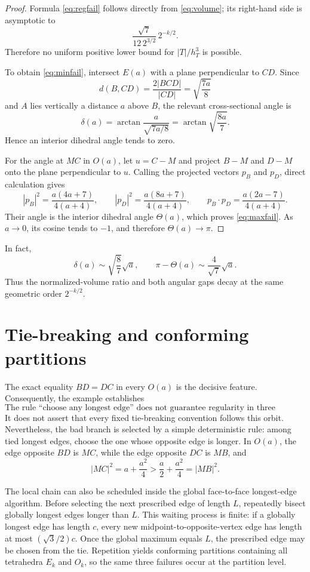 \documentclass[10pt]{article}
\theoremstyle{definition}
\begin{document}
\begin{proof}
Formula \eqref{eq:regfail} follows directly from \eqref{eq:volume}; its right-hand side is asymptotic to
\[
\frac{\sqrt7}{12\,2^{3/2}}\,2^{-k/2}.
\]
Therefore no uniform positive lower bound for $|T|/h_T^3$ is possible.

To obtain \eqref{eq:minfail}, intersect $E(a)$ with a plane perpendicular to $CD$.  Since
\[
d(B,CD)=\frac{2|BCD|}{|CD|}=\sqrt{\frac{7a}{8}}
\]
and $A$ lies vertically a distance $a$ above $B$, the relevant cross-sectional angle is
\[
\delta(a)=\arctan\frac{a}{\sqrt{7a/8}}
=\arctan\sqrt{\frac{8a}{7}}.
\]
Hence an interior dihedral angle tends to zero.

For the angle at $MC$ in $O(a)$, let $u=C-M$ and project $B-M$ and $D-M$ onto the plane perpendicular to $u$.  Calling the projected vectors $p_B$ and $p_D$, direct calculation gives
\[
|p_B|^2=\frac{a(4a+7)}{4(a+4)},\qquad
|p_D|^2=\frac{a(8a+7)}{4(a+4)},\qquad
p_B\!\cdot p_D=\frac{a(2a-7)}{4(a+4)}.
\]
Their angle is the interior dihedral angle $\Theta(a)$, which proves \eqref{eq:maxfail}.  As $a\to0$, its cosine tends to $-1$, and therefore $\Theta(a)\to\pi$.
\end{proof}

In fact,
\begin{equation}\label{eq:rates}
\delta(a)\sim\sqrt{\frac87}\sqrt a,
\qquad
\pi-\Theta(a)\sim\frac4{\sqrt7}\sqrt a.
\end{equation}
Thus the normalized-volume ratio and both angular gaps decay at the same geometric order $2^{-k/2}$.



\section{Tie-breaking and conforming partitions}

The exact equality $BD=DC$ in every $O(a)$ is the decisive feature.  Consequently, the example establishes
\[
\boxed{\text{The rule ``choose any longest edge'' does not guarantee regularity in three dimensions.}}
\]
It does not assert that every fixed tie-breaking convention follows this orbit.  Nevertheless, the bad branch is selected by a simple deterministic rule: among tied longest edges, choose the one whose opposite edge is longer.  In $O(a)$, the edge opposite $BD$ is $MC$, while the edge opposite $DC$ is $MB$, and
\[
|MC|^2=a+\frac{a^2}{4}>\frac a2+\frac{a^2}{4}=|MB|^2.
\]

The local chain can also be scheduled inside the global face-to-face longest-edge algorithm.  Before selecting the next prescribed edge of length $L$, repeatedly bisect globally longest edges longer than $L$.  This waiting process is finite: if a globally longest edge has length $c$, every new midpoint-to-opposite-vertex edge has length at most $(\sqrt3/2)c$.  Once the global maximum equals $L$, the prescribed edge may be chosen from the tie.  Repetition yields conforming partitions containing all tetrahedra $E_k$ and $O_k$, so the same three failures occur at the partition level.
\end{document}

